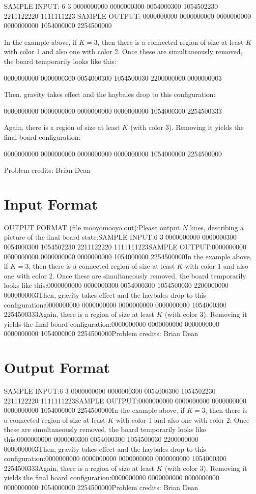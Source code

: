\documentclass[12pt]{article}
\begin{document}
SAMPLE INPUT:
6 3
0000000000
0000000300
0054000300
1054502230
2211122220
1111111223
SAMPLE OUTPUT: 
0000000000
0000000000
0000000000
0000000000
1054000000
2254500000

In the example above, if $K = 3$, then there is a connected region of size at
least $K$ with color 1 and also one with color 2.  Once these are simultaneously
removed, the board temporarily looks like this:


0000000000
0000000300
0054000300
1054500030
2200000000
0000000003

Then, gravity takes effect and the haybales drop to this configuration:


0000000000
0000000000
0000000000
0000000000
1054000300
2254500333

Again, there is a region of size at least $K$ (with color 3).  Removing it
yields the final board configuration:


0000000000
0000000000
0000000000
0000000000
1054000000
2254500000


Problem credits: Brian Dean



\section*{Input Format}
OUTPUT FORMAT (file mooyomooyo.out):Please output $N$ lines, describing a picture of the final board state.SAMPLE INPUT:6 3
0000000000
0000000300
0054000300
1054502230
2211122220
1111111223SAMPLE OUTPUT:0000000000
0000000000
0000000000
0000000000
1054000000
2254500000In the example above, if $K = 3$, then there is a connected region of size at
least $K$ with color 1 and also one with color 2.  Once these are simultaneously
removed, the board temporarily looks like this:0000000000
0000000300
0054000300
1054500030
2200000000
0000000003Then, gravity takes effect and the haybales drop to this configuration:0000000000
0000000000
0000000000
0000000000
1054000300
2254500333Again, there is a region of size at least $K$ (with color 3).  Removing it
yields the final board configuration:0000000000
0000000000
0000000000
0000000000
1054000000
2254500000Problem credits: Brian Dean

\section*{Output Format}
SAMPLE INPUT:6 3
0000000000
0000000300
0054000300
1054502230
2211122220
1111111223SAMPLE OUTPUT:0000000000
0000000000
0000000000
0000000000
1054000000
2254500000In the example above, if $K = 3$, then there is a connected region of size at
least $K$ with color 1 and also one with color 2.  Once these are simultaneously
removed, the board temporarily looks like this:0000000000
0000000300
0054000300
1054500030
2200000000
0000000003Then, gravity takes effect and the haybales drop to this configuration:0000000000
0000000000
0000000000
0000000000
1054000300
2254500333Again, there is a region of size at least $K$ (with color 3).  Removing it
yields the final board configuration:0000000000
0000000000
0000000000
0000000000
1054000000
2254500000Problem credits: Brian Dean
\end{document}
